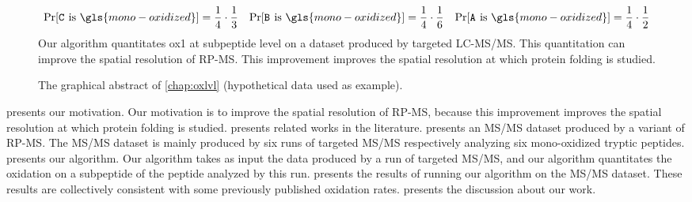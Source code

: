 \begin{figure}[tpbh]
\begin{framed}
\noindent
\footnotesize{
\noindent
\begin{align*}
	    \displaystyle\Pr[\mathtt{C_{}} \text{ is } \gls{mono-oxidized}] = \frac{1}{4} \cdot \frac{1}{3} %
	&&  \displaystyle\Pr[\mathtt{B_{}} \text{ is } \gls{mono-oxidized}] = \frac{1}{4} \cdot \frac{1}{6} %
	&&  \displaystyle\Pr[\mathtt{A_{}} \text{ is } \gls{mono-oxidized}] = \frac{1}{4} \cdot \frac{1}{2} %
\end{align*}
\noindent
Our algorithm quantitates \gls{ox1} at subpeptide level on a dataset produced by targeted \gls{LC-MS/MS}. 
	This quantitation can improve the spatial resolution of \gls{RP-MS}.
  This improvement improves the spatial resolution at which protein folding is studied.
}	
\endgroup
\end{framed}
\caption[
	The graphical abstract of \cref{chap:oxlvl}.]{
	The graphical abstract of \cref{chap:oxlvl} (hypothetical data used as example).
	\label{fig:OX:motivation:graphical-abstract}}
\end{figure}
\clearpage

 presents our motivation.
Our motivation is to improve the spatial resolution of \gls{RP-MS},
	because this improvement improves the spatial resolution at which protein folding is studied.
 presents related works in the literature. 
 presents an \gls{MS/MS} dataset produced by a variant of \gls{RP-MS}.
The \gls{MS/MS} dataset is mainly produced by six runs of targeted \gls{MS/MS} respectively analyzing six \gls{mono-oxidized} tryptic peptides. 
 presents our algorithm.
Our algorithm takes as input the data produced by a run of targeted \gls{MS/MS},
	and our algorithm quantitates the oxidation on a subpeptide of the peptide analyzed by this run.
 presents the results of running our algorithm on the \gls{MS/MS} dataset. 
These results are collectively consistent with some previously published oxidation rates.
 presents the discussion about our work.
	
